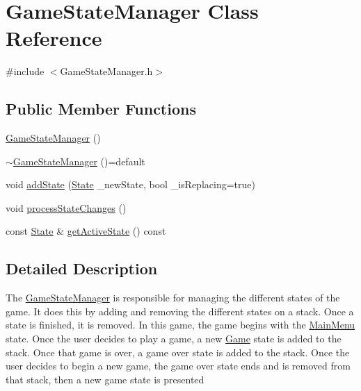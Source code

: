 \hypertarget{class_game_state_manager}{}\section{Game\+State\+Manager Class Reference}
\label{class_game_state_manager}


{\ttfamily \#include $<$Game\+State\+Manager.\+h$>$}

\subsection*{Public Member Functions}
\begin{DoxyCompactItemize}
\item 
\mbox{\hyperlink{class_game_state_manager_aa9769dca27ad070cf5491a7f54c7d85e}{Game\+State\+Manager}} ()
\item 
\mbox{\hyperlink{class_game_state_manager_ac4bbd99de7c51df4377bf25d367cc527}{$\sim$\+Game\+State\+Manager}} ()=default
\item 
void \mbox{\hyperlink{class_game_state_manager_af891544d0671ad46cb561f350ed3d175}{add\+State}} (\mbox{\hyperlink{_game_state_manager_8h_aff87e674f0407654608d089427df6ab3}{State}} \+\_\+new\+State, bool \+\_\+is\+Replacing=true)
\item 
void \mbox{\hyperlink{class_game_state_manager_aa392462be47af93a17c12d2b9f90afb0}{process\+State\+Changes}} ()
\item 
const \mbox{\hyperlink{_game_state_manager_8h_aff87e674f0407654608d089427df6ab3}{State}} \& \mbox{\hyperlink{class_game_state_manager_a5b42b1e97123439df8e476c89d3b8a68}{get\+Active\+State}} () const
\end{DoxyCompactItemize}


\subsection{Detailed Description}
The \mbox{\hyperlink{class_game_state_manager}{Game\+State\+Manager}} is responsible for managing the different states of the game. It does this by adding and removing the different states on a stack. Once a state is finished, it is removed. In this game, the game begins with the \mbox{\hyperlink{class_main_menu}{Main\+Menu}} state. Once the user decides to play a game, a new \mbox{\hyperlink{class_game}{Game}} state is added to the stack. Once that game is over, a game over state is added to the stack. Once the user decides to begin a new game, the game over state ends and is removed from that stack, then a new game state is presented 

